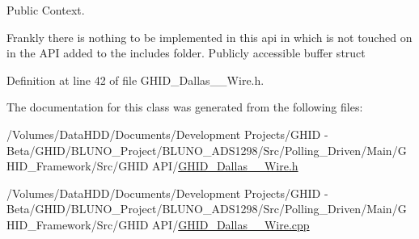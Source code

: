 \-Public \-Context. 

\-Frankly there is nothing to be implemented in this api in which is not touched on in the \-A\-P\-I added to the includes folder. \-Publicly accessible buffer struct 

\-Definition at line 42 of file \-G\-H\-I\-D\-\_\-\-Dallas\-\_\-\_\-\-Wire.\-h.



\-The documentation for this class was generated from the following files\-:\begin{DoxyCompactItemize}
\item 
/\-Volumes/\-Data\-H\-D\-D/\-Documents/\-Development Projects/\-G\-H\-I\-D -\/ Beta/\-G\-H\-I\-D/\-B\-L\-U\-N\-O\-\_\-\-Project/\-B\-L\-U\-N\-O\-\_\-\-A\-D\-S1298/\-Src/\-Polling\-\_\-\-Driven/\-Main/\-G\-H\-I\-D\-\_\-\-Framework/\-Src/\-G\-H\-I\-D A\-P\-I/\hyperlink{_g_h_i_d___dallas__1___wire_8h}{\-G\-H\-I\-D\-\_\-\-Dallas\-\_\-\_\-\-Wire.\-h}\item 
/\-Volumes/\-Data\-H\-D\-D/\-Documents/\-Development Projects/\-G\-H\-I\-D -\/ Beta/\-G\-H\-I\-D/\-B\-L\-U\-N\-O\-\_\-\-Project/\-B\-L\-U\-N\-O\-\_\-\-A\-D\-S1298/\-Src/\-Polling\-\_\-\-Driven/\-Main/\-G\-H\-I\-D\-\_\-\-Framework/\-Src/\-G\-H\-I\-D A\-P\-I/\hyperlink{_g_h_i_d___dallas__1___wire_8cpp}{\-G\-H\-I\-D\-\_\-\-Dallas\-\_\-\_\-\-Wire.\-cpp}\end{DoxyCompactItemize}
